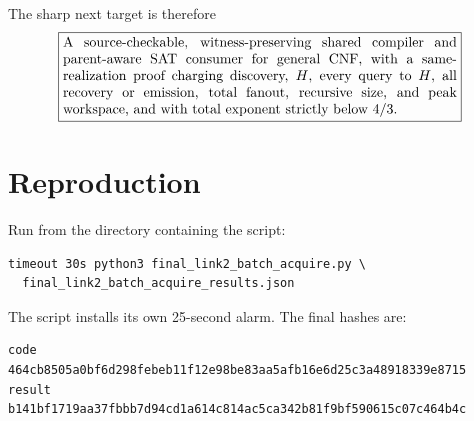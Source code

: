 \documentclass[11pt]{article}
\begin{document}
The sharp next target is therefore
\[
 \boxed{\begin{minipage}{0.82\linewidth}
 A source-checkable, witness-preserving shared compiler and parent-aware SAT
 consumer for general CNF, with a same-realization proof charging discovery,
 $H$, every query to $H$, all recovery or emission, total fanout, recursive
 size, and peak workspace, and with total exponent strictly below $4/3$.
 \end{minipage}}
\]

\section{Reproduction}

Run from the directory containing the script:
\begin{verbatim}
timeout 30s python3 final_link2_batch_acquire.py \
  final_link2_batch_acquire_results.json
\end{verbatim}
The script installs its own 25-second alarm.  The final hashes are:
\begin{verbatim}
code   464cb8505a0bf6d298febeb11f12e98be83aa5afb16e6d25c3a48918339e8715
result b141bf1719aa37fbbb7d94cd1a614c814ac5ca342b81f9bf590615c07c464b4c
\end{verbatim}




\end{document}

